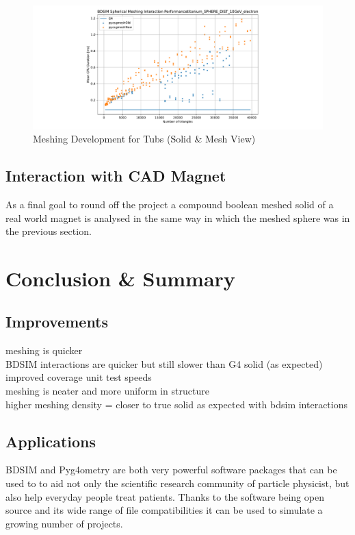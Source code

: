 \documentclass[12pt,a4paper]{article}
\begin{document}
\begin{figure}[h!]
\centering
\includegraphics[scale=0.5]{Images//BDSIM//numoftris_tit_10G_e_nostd.pdf}
\caption[width=\columnwidth]{Meshing Development for Tubs (Solid \& Mesh View)}
\label{tubspic}
\end{figure}

\subsection{Interaction with CAD Magnet}
As a final goal to round off the project a compound boolean meshed solid of a real world magnet is analysed in the same way in which the meshed sphere was in the previous section. 
\newpage
\section{Conclusion \& Summary}
\label{conc}

\subsection{Improvements}
meshing is quicker\\
BDSIM interactions are quicker but still slower than G4 solid (as expected)
improved coverage unit test speeds\\
meshing is neater and more uniform in structure\\
higher meshing density = closer to true solid as expected with bdsim interactions\\

\subsection{Applications}
BDSIM and Pyg4ometry are both very powerful software packages that can be used to to aid not only the scientific research community of particle physicist, but also help everyday people treat patients. Thanks to the software being open source and its wide range of file compatibilities it can be used to simulate a growing number of projects.
\end{document}
